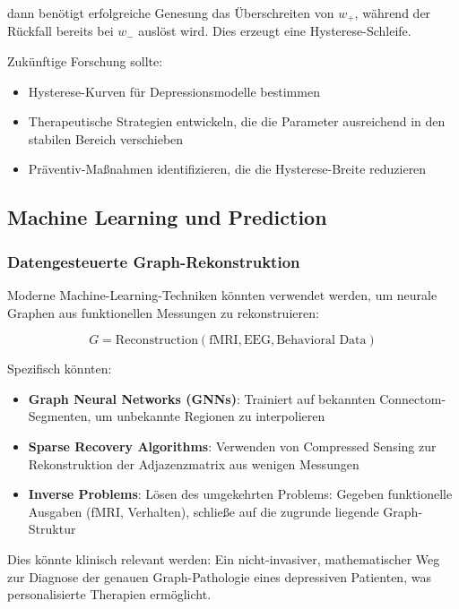 \documentclass[a4paper,12pt]{article}
\theoremstyle{definition}
\begin{document}
dann benötigt erfolgreiche Genesung das Überschreiten von $w_+$, während der Rückfall bereits bei $w_-$ auslöst wird. Dies erzeugt eine Hysterese-Schleife.

Zukünftige Forschung sollte:
\begin{itemize}
	\item Hysterese-Kurven für Depressionsmodelle bestimmen
	\item Therapeutische Strategien entwickeln, die die Parameter ausreichend in den stabilen Bereich verschieben
	\item Präventiv-Maßnahmen identifizieren, die die Hysterese-Breite reduzieren
\end{itemize}

\subsection{Machine Learning und Prediction}

\subsubsection{Datengesteuerte Graph-Rekonstruktion}

Moderne Machine-Learning-Techniken könnten verwendet werden, um neurale Graphen aus funktionellen Messungen zu rekonstruieren:

\begin{equation}
G = \text{Reconstruction}(\text{fMRI}, \text{EEG}, \text{Behavioral Data})
\end{equation}

Spezifisch könnten:

\begin{itemize}
	\item \textbf{Graph Neural Networks (GNNs)}: Trainiert auf bekannten Connectom-Segmenten, um unbekannte Regionen zu interpolieren
	\item \textbf{Sparse Recovery Algorithms}: Verwenden von Compressed Sensing zur Rekonstruktion der Adjazenzmatrix aus wenigen Messungen
	\item \textbf{Inverse Problems}: Lösen des umgekehrten Problems: Gegeben funktionelle Ausgaben (fMRI, Verhalten), schließe auf die zugrunde liegende Graph-Struktur
\end{itemize}

Dies könnte klinisch relevant werden: Ein nicht-invasiver, mathematischer Weg zur Diagnose der genauen Graph-Pathologie eines depressiven Patienten, was personalisierte Therapien ermöglicht.
\end{document}
